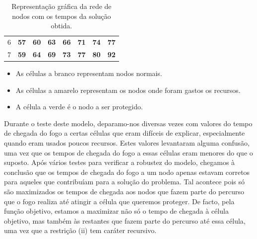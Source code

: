 \documentclass[11pt]{article} %
\begin{document}
\begin{table}[h]
\begin{tabular}{cccccccc}
\multicolumn{1}{c|}{6} & \multicolumn{1}{c|}{\textbf{57}}                         & \multicolumn{1}{c|}{\textbf{60}}                         & \multicolumn{1}{c|}{\textbf{63}}                         & \multicolumn{1}{c|}{\textbf{66}} & \multicolumn{1}{c|}{\textbf{71}} & \multicolumn{1}{c|}{\textbf{74}}                         & \multicolumn{1}{c|}{\cellcolor[HTML]{F8FF00}\textbf{77}} \\ \cline{2-8} 
\multicolumn{1}{c|}{7} & \multicolumn{1}{c|}{\textbf{59}}                         & \multicolumn{1}{c|}{\textbf{64}}                         & \multicolumn{1}{c|}{\textbf{69}}                         & \multicolumn{1}{c|}{\textbf{73}} & \multicolumn{1}{c|}{\textbf{77}} & \multicolumn{1}{c|}{\cellcolor[HTML]{F8FF00}\textbf{80}} & \multicolumn{1}{c|}{\cellcolor[HTML]{32CB00}\textbf{92}} \\ \cline{2-8} 
\end{tabular}
\caption{Representação gráfica da rede de nodos com os tempos da solução obtida.}
\end{table}
\begin{itemize}[$\ast$]
    \item As células a branco representam nodos normais.
    \item As células a amarelo representam os nodos onde foram gastos os recursos.
    \item A célula a verde é o nodo a ser protegido.
\end{itemize}
\par Durante o teste deste modelo, deparamo-nos diversas vezes com valores do tempo de chegada do fogo a certas células que eram difíceis de explicar, especialmente quando eram usados poucos recursos. Estes valores levantaram alguma confusão, uma vez que os tempos de chegada do fogo a essas células eram menores do que o suposto. Após vários testes para verificar a robustez do modelo, chegamos à conclusão que os tempos de chegada do fogo a um nodo apenas estavam corretos para aqueles que contribuíam para a solução do problema. Tal acontece pois só são maximizados os tempos de chegada aos nodos que fazem parte do percurso que o fogo realiza até atingir a célula que queremos proteger. De facto, pela função objetivo, estamos a maximizar não só o tempo de chegada à célula objetivo, mas também às restantes que fazem parte do percurso até essa célula, uma vez que a restrição (ii) tem caráter recursivo.
\end{document}
